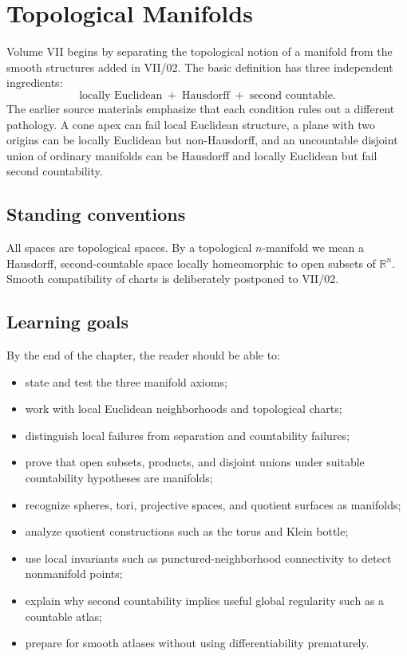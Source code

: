 \chapter{Topological Manifolds}
\label{ch:vii01-topological-manifolds}

Volume VII begins by separating the topological notion of a manifold from the smooth structures added in VII/02.  The basic definition has three independent ingredients:
\[
\boxed{\text{locally Euclidean}\;+\;\text{Hausdorff}\;+\;\text{second countable}.}
\]
The earlier source materials emphasize that each condition rules out a different pathology.  A cone apex can fail local Euclidean structure, a plane with two origins can be locally Euclidean but non-Hausdorff, and an uncountable disjoint union of ordinary manifolds can be Hausdorff and locally Euclidean but fail second countability.

\section*{Standing conventions}
All spaces are topological spaces.  By a topological \(n\)-manifold we mean a Hausdorff, second-countable space locally homeomorphic to open subsets of \(\mathbb R^n\).  Smooth compatibility of charts is deliberately postponed to VII/02.

\section*{Learning goals}
By the end of the chapter, the reader should be able to:
\begin{itemize}
\item state and test the three manifold axioms;
\item work with local Euclidean neighborhoods and topological charts;
\item distinguish local failures from separation and countability failures;
\item prove that open subsets, products, and disjoint unions under suitable countability hypotheses are manifolds;
\item recognize spheres, tori, projective spaces, and quotient surfaces as manifolds;
\item analyze quotient constructions such as the torus and Klein bottle;
\item use local invariants such as punctured-neighborhood connectivity to detect nonmanifold points;
\item explain why second countability implies useful global regularity such as a countable atlas;
\item prepare for smooth atlases without using differentiability prematurely.
\end{itemize}

